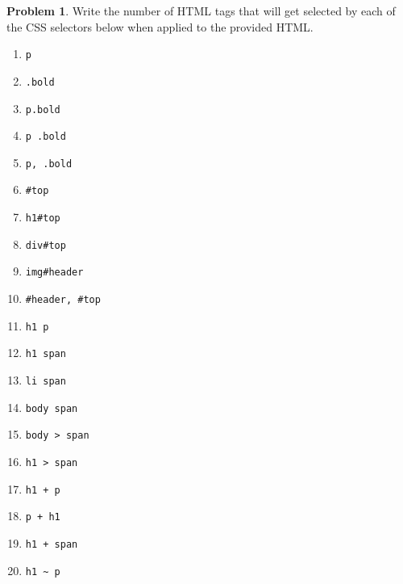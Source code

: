 \documentclass[10pt]{article}
\theoremstyle{definition}
\newtheorem{problem}{Problem}
\begin{document}
\noindent
\begin{problem}
    Write the number of HTML tags that will get selected by each of the CSS selectors below when applied to the provided HTML.

\begin{enumerate}[before=\setlength{\baselineskip}{7mm}]

    \item
    \lstinline{p}

    \item
    \lstinline{.bold}

    \item
    \lstinline{p.bold}

    \item
    \lstinline{p .bold}

    \item
    \lstinline{p, .bold}

    \item
    \lstinline{#top}

    \item
    \lstinline{h1#top}

    \item
    \lstinline{div#top}

    \item
    \lstinline{img#header}

    \item
    \lstinline{#header, #top}

    \item
    \lstinline{h1 p}

    \item
    \lstinline{h1 span}

    \item
    \lstinline{li span}

    \item
    \lstinline{body span}

    \item
    \lstinline{body > span}

    \item
    \lstinline{h1 > span}

    \item
    \lstinline{h1 + p}

    \item
    \lstinline{p + h1}

    \item
    \lstinline{h1 + span}

    \item
    \lstinline{h1 ~ p}


\end{enumerate}
\end{problem}
\end{document}
